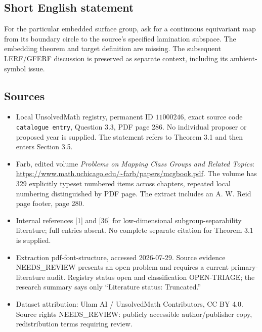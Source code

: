 \documentclass[11pt]{article}
\begin{document}
\subsection{Short English statement}
For the particular embedded surface group, ask for a continuous equivariant map from its boundary circle to the source's specified lamination subspace. The embedding theorem and target definition are missing. The subsequent LERF/GFERF discussion is preserved as separate context, including its ambient-symbol issue.
\subsection{Sources}
\begin{itemize}
\item Local UnsolvedMath registry, permanent ID \(11000246\), exact source code \texttt{catalogue entry}, Question 3.3, PDF page 286. No individual proposer or proposed year is supplied. The statement refers to Theorem 3.1 and then enters Section 3.5.
\item Farb, edited volume \emph{Problems on Mapping Class Groups and Related Topics}: \url{https://www.math.uchicago.edu/~farb/papers/mcgbook.pdf}. The volume has 329 explicitly typeset numbered items across chapters, repeated local numbering distinguished by PDF page. The extract includes an A. W. Reid page footer, page 280.
\item Internal references [1] and [36] for low-dimensional subgroup-separability literature; full entries absent. No complete separate citation for Theorem 3.1 is supplied.
\item Extraction pdf-font-structure, accessed 2026-07-29. Source evidence NEEDS\_REVIEW presents an open problem and requires a current primary-literature audit. Registry status open and classification OPEN-TRIAGE; the research summary says only ``Literature status: Truncated.''
\item Dataset attribution: Ulam AI / UnsolvedMath Contributors, CC BY 4.0. Source rights NEEDS\_REVIEW: publicly accessible author/publisher copy, redistribution terms requiring review.
\end{itemize}
\end{document}
